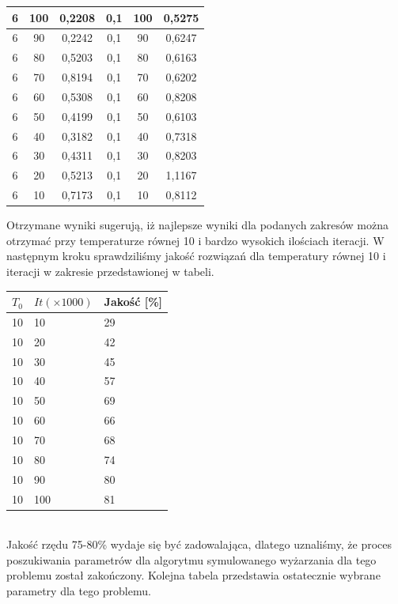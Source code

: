 \documentclass[twoside]{projektInzynierskiMS1}
\newcommand{\si}{ś}
\begin{document}
\begin{table}[htbp]
\begin{tabular}{|c|c|c||c|c|c|}
6 & 100 & 0,2208 & 0,1 & 100 & 0,5275 \\ \hline 
6 & 90 & 0,2242& 0,1 & 90 & 0,6247 \\ \hline 
6 & 80 & 0,5203 & 0,1 & 80 & 0,6163 \\ \hline 
6 & 70 & 0,8194 & 0,1 & 70 & 0,6202 \\ \hline 
6 & 60 & 0,5308 & 0,1 & 60 & 0,8208 \\ \hline
6 & 50 & 0,4199& 0,1 & 50 & 0,6103 \\ \hline 
6 & 40 & 0,3182 & 0,1 & 40 & 0,7318\\ \hline 
6 & 30 & 0,4311 & 0,1 & 30 & 0,8203 \\ \hline 
6 & 20 & 0,5213 & 0,1 & 20 & 1,1167 \\ \hline 
6 & 10 & 0,7173 & 0,1 & 10 & 0,8112 \\ \hline 





\end{tabular} 
\end{table}

Otrzymane wyniki sugerują, iż najlepsze wyniki dla podanych zakresów można otrzymać przy temperaturze równej 10 i bardzo wysokich ilo\si ciach iteracji. W następnym kroku sprawdzili\si my jako\si ć rozwiązań dla temperatury równej 10 i iteracji w zakresie przedstawionej w tabeli. \\

\begin{tabularx}{\textwidth}{|X|X|X|} 
                  \hline
 $T_0$ & $It (\times 1000)$& Jako\si ć [\%]\\ \hline
10 & 10 & 29 \\ \hline
10 & 20 & 42 \\ \hline
10 & 30 & 45 \\ \hline 
10 & 40 & 57 \\ \hline 
10 & 50 & 69 \\ \hline 
10 & 60 & 66 \\ \hline
10 & 70 & 68 \\ \hline 
10 & 80 & 74 \\ \hline 
10 & 90 &  80\\ \hline 
10 & 100 & 81 \\ \hline 
\end{tabularx} \\

Jako\si ć rzędu 75-80\% wydaje się być zadowalająca, dlatego uznali\si my, że proces poszukiwania parametrów dla algorytmu symulowanego wyżarzania dla tego problemu został zakończony. Kolejna tabela przedstawia ostatecznie wybrane parametry dla tego problemu. \\
\end{document}
